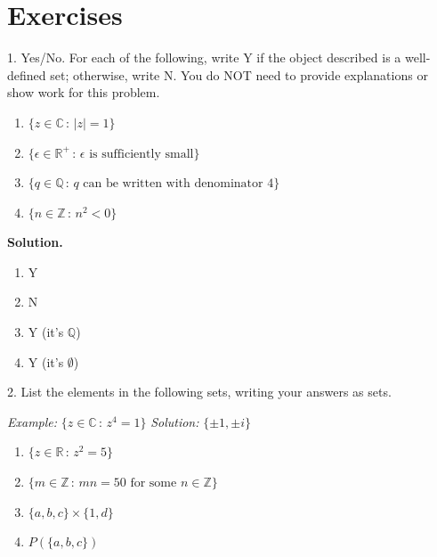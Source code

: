\documentclass[10pt,]{book}
\theoremstyle{plain}
\theoremstyle{definition}
\theoremstyle{definition}
\theoremstyle{definition}
\theoremstyle{definition}
\numberwithin{equation}{section}
\def\Z{\mathbb{Z}}
\def\R{\mathbb{R}}
\def\Q{\mathbb{Q}}
\def\C{\mathbb{C}}
\newcommand{\lt}{<}
\begin{document}
\section[{Exercises}]{Exercises}\label{exercises-1}
\begin{exerciselist}
\item[1.]\hypertarget{exercise-1}{}Yes/No. For each of the following, write Y if the object described is a well-defined set; otherwise, write N. You do NOT need to provide explanations or show work for this problem. \leavevmode%
\begin{enumerate}[label=(\alph*)]
\item\hypertarget{li-23}{}\(\{z \in \C \,:\, |z|=1\}\)%
\item\hypertarget{li-24}{}\(\{\epsilon \in \R^+\,:\, \epsilon \mbox{ is sufficiently small} \}\)%
\item\hypertarget{li-25}{}\(\{q\in \Q \,:\, q \mbox{ can be written  with denominator } 4\}\)%
\item\hypertarget{li-26}{}\(\{n \in \Z\,:\, n^2 \lt 0\}\)%
\end{enumerate}
%
\par\smallskip
\par\smallskip
\noindent\textbf{Solution.}\hypertarget{solution-1}{}\quad
\leavevmode%
\begin{multicols}{4}
\begin{enumerate}[label=(\alph*)]
\item\hypertarget{li-27}{}Y%
\item\hypertarget{li-28}{}N%
\item\hypertarget{li-29}{}Y (it's \(\Q\))%
\item\hypertarget{li-30}{}Y (it's \(\emptyset\))%
\end{enumerate}
\end{multicols}
\item[2.]\hypertarget{exercise-2}{}List the elements in the following sets, writing your answers as sets.%
\par
\emph{Example:} \(\{z\in \C\,:\,z^4=1\}\) \emph{Solution:} \(\{\pm 1, \pm i\}\) \leavevmode%
\begin{enumerate}[label=(\alph*)]
\item\hypertarget{li-31}{}\(\{z\in \R\,:\, z^2=5\}\)%
\item\hypertarget{li-32}{}\(\{m \in \Z\,:\, mn=50 \mbox{ for some } n\in \Z\}\)%
\item\hypertarget{li-33}{}\(\{a,b,c\}\times \{1,d\}\)%
\item\hypertarget{li-34}{}\(P(\{a,b,c\})\)%

\end{enumerate}
\end{exerciselist}
\end{document}
